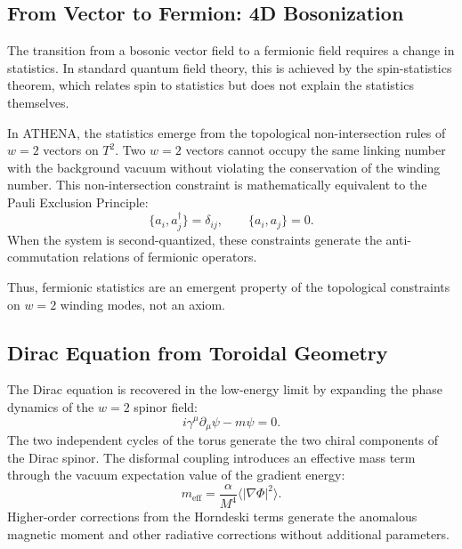 \documentclass[11pt,a4paper]{article}
\begin{document}
\subsection{From Vector to Fermion: 4D Bosonization}
The transition from a bosonic vector field to a fermionic field requires a change in statistics. In standard quantum field theory, this is achieved by the spin-statistics theorem, which relates spin to statistics but does not explain the statistics themselves.

In ATHENA, the statistics emerge from the topological non-intersection rules of \(w = 2\) vectors on \(T^2\). Two \(w = 2\) vectors cannot occupy the same linking number with the background vacuum without violating the conservation of the winding number. This non-intersection constraint is mathematically equivalent to the Pauli Exclusion Principle:
\begin{equation}
\{a_{i},a_{j}^{\dagger}\} = \delta_{ij},\qquad \{a_{i},a_{j}\} = 0. \tag{28}
\end{equation}
When the system is second-quantized, these constraints generate the anti-commutation relations of fermionic operators.

Thus, fermionic statistics are an emergent property of the topological constraints on \(w = 2\) winding modes, not an axiom.

\subsection{Dirac Equation from Toroidal Geometry}
The Dirac equation is recovered in the low-energy limit by expanding the phase dynamics of the \(w = 2\) spinor field:
\begin{equation}
i\gamma^{\mu}\partial_{\mu}\psi -m\psi = 0. \tag{29}
\end{equation}
The two independent cycles of the torus generate the two chiral components of the Dirac spinor. The disformal coupling introduces an effective mass term through the vacuum expectation value of the gradient energy:
\begin{equation}
m_{\mathrm{eff}} = \frac{\alpha}{M^4}\langle |\nabla \Phi |^2\rangle . \tag{30}
\end{equation}
Higher-order corrections from the Horndeski terms generate the anomalous magnetic moment and other radiative corrections without additional parameters.
\end{document}

